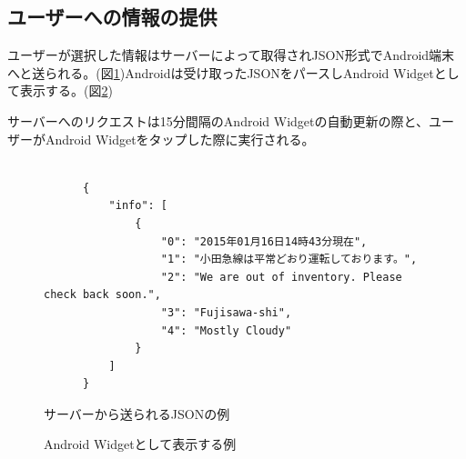 \subsection{ユーザーへの情報の提供}
ユーザーが選択した情報はサーバーによって取得されJSON形式でAndroid端末へと送られる。(図\ref{fig:JSON})Androidは受け取ったJSONをパースしAndroid Widgetとして表示する。(図\ref{fig:widget})

サーバーへのリクエストは15分間隔のAndroid Widgetの自動更新の際と、ユーザーがAndroid Widgetをタップした際に実行される。

\begin{figure}[htbp]
  \begin{minipage}{\hsize}
    \begin{center}
      \begin{lstlisting}[basicstyle=\ttfamily\footnotesize, frame=single]

      {
          "info": [
              {
                  "0": "2015年01月16日14時43分現在",
                  "1": "小田急線は平常どおり運転しております。",
                  "2": "We are out of inventory. Please check back soon.",
                  "3": "Fujisawa-shi",
                  "4": "Mostly Cloudy"
              }
          ]
      }

      \end{lstlisting}
    \end{center}
    \caption{サーバーから送られるJSONの例}
    \label{fig:JSON}
  \end{minipage}
\end{figure}

\begin{figure}[htbp]
  \begin{minipage}{\hsize}
    \begin{center}
    \end{center}
    \caption{Android Widgetとして表示する例}
    \label{fig:widget}
  \end{minipage}
\end{figure}

\nocite{*}
